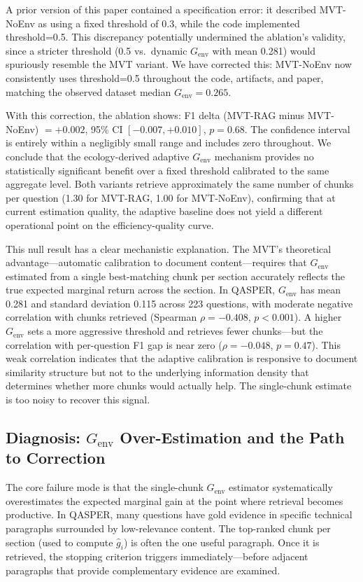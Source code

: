 \documentclass[11pt,letterpaper]{article}
\begin{document}
A prior version of this paper contained a specification error: it described MVT-NoEnv as using a fixed threshold of
0.3, while the code implemented threshold=0.5. This discrepancy potentially undermined the ablation's validity, since a
stricter threshold (0.5 vs.\ dynamic $G_{\mathrm{env}}$ with mean 0.281) would spuriously resemble the MVT variant. We
have corrected this: MVT-NoEnv now consistently uses threshold=0.5 throughout the code, artifacts, and paper, matching
the observed dataset median $G_{\mathrm{env}}=0.265$.

With this correction, the ablation shows: F1 delta (MVT-RAG minus MVT-NoEnv) $= +0.002$, 95\% CI $[-0.007, +0.010]$,
$p=0.68$. The confidence interval is entirely within a negligibly small range and includes zero throughout. We conclude
that the ecology-derived adaptive $G_{\mathrm{env}}$ mechanism provides no statistically significant benefit over a
fixed threshold calibrated to the same aggregate level. Both variants retrieve approximately the same number of chunks
per question (1.30 for MVT-RAG, 1.00 for MVT-NoEnv), confirming that at current estimation quality, the adaptive
baseline does not yield a different operational point on the efficiency-quality curve.

This null result has a clear mechanistic explanation. The MVT's theoretical advantage---automatic calibration to
document content---requires that $G_{\mathrm{env}}$ estimated from a single best-matching chunk per section accurately
reflects the true expected marginal return across the section. In QASPER, $G_{\mathrm{env}}$ has mean 0.281 and
standard deviation 0.115 across 223 questions, with moderate negative correlation with chunks retrieved (Spearman
$\rho=-0.408$, $p{<}0.001$). A higher $G_{\mathrm{env}}$ sets a more aggressive threshold and retrieves fewer
chunks---but the correlation with per-question F1 gap is near zero ($\rho=-0.048$, $p=0.47$). This weak correlation
indicates that the adaptive calibration is responsive to document similarity structure but not to the underlying
information density that determines whether more chunks would actually help. The single-chunk estimate is too noisy to
recover this signal.

\subsection{Diagnosis: \texorpdfstring{$G_{\mathrm{env}}$}{G\_env} Over-Estimation and the Path to Correction}

The core failure mode is that the single-chunk $G_{\mathrm{env}}$ estimator systematically overestimates the expected
marginal gain at the point where retrieval becomes productive. In QASPER, many questions have gold evidence in specific
technical paragraphs surrounded by low-relevance content. The top-ranked chunk per section (used to compute $\hat{g}_i$)
is often the one useful paragraph. Once it is retrieved, the stopping criterion triggers immediately---before adjacent
paragraphs that provide complementary evidence are examined.
\end{document}
